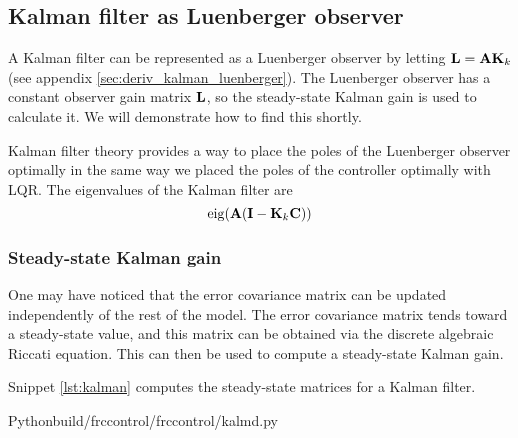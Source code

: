 \subsection{Kalman filter as Luenberger observer}

A Kalman filter can be represented as a Luenberger \gls{observer} by letting
$\mathbf{L} = \mathbf{A} \mathbf{K}_k$ (see appendix \ref{sec:deriv_kalman_luenberger}).
The Luenberger observer has a constant observer gain matrix $\mathbf{L}$, so the
steady-state Kalman gain is used to calculate it. We will demonstrate how to
find this shortly.

Kalman filter theory provides a way to place the poles of the Luenberger
observer optimally in the same way we placed the poles of the controller
optimally with LQR. The eigenvalues of the Kalman filter are
\begin{equation}
  \operatorname{eig}(\mathbf{A}(\mathbf{I} - \mathbf{K}_k\mathbf{C}))
\end{equation}

\subsubsection{Steady-state Kalman gain}

One may have noticed that the error covariance matrix can be updated
independently of the rest of the \gls{model}. The error covariance matrix tends
toward a steady-state value, and this matrix can be obtained via the discrete
algebraic Riccati equation. This can then be used to compute a steady-state
Kalman gain.

Snippet \ref{lst:kalman} computes the steady-state matrices for a Kalman
filter.
\begin{coderemote}{Python}{build/frccontrol/frccontrol/kalmd.py}
  \caption{Steady-state Kalman gain and error covariance matrices calculation in
    Python}
  \label{lst:kalman}
\end{coderemote}
